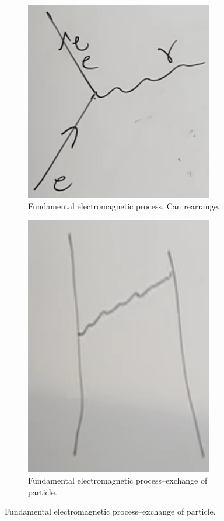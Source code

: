 \documentclass[]{article}
\begin{document}
\begin{figure}[H]
	\caption{$\mathcal{L}$: $e \Psi_e^\dagger \Psi_e A$}\label{fig:fep}
	\begin{subfigure}{0.45\textwidth}
		\caption{Fundamental electromagnetic process. Can rearrange.}\label{fig:fep1}
		\includegraphics[width=0.9\textwidth]{2-1-em-process}
	\end{subfigure}
	\begin{subfigure}{0.45\textwidth}
		\caption{Fundamental electromagnetic process--exchange of particle.}\label{fig:fep2}
		\includegraphics[width=0.9\textwidth]{2-1-em-process-feynman}

\end{subfigure}
\end{figure}
\end{document}
